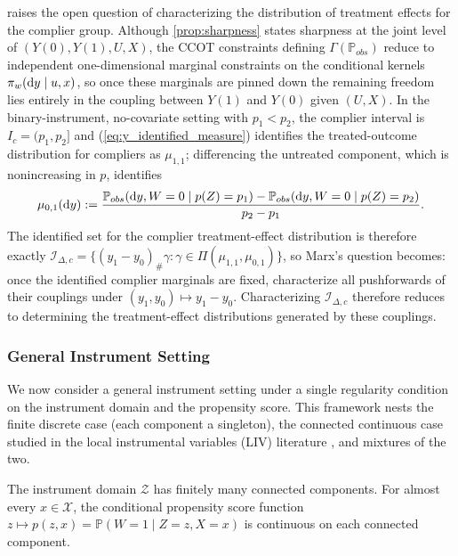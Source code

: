 \begin{remark} \label{rem:marx-open}
\citet{marx2024sharp} raises the open question of characterizing the distribution of treatment effects for the complier group. Although \cref{prop:sharpness} states sharpness at the joint level of $(Y(0), Y(1), U, X)$, the CCOT constraints defining $\Gamma(\mathbb{P}_{obs})$ reduce to independent one-dimensional marginal constraints on the conditional kernels $\pi_w({\rm d} y \mid u, x)$, so once these marginals are pinned down the remaining freedom lies entirely in the coupling between $Y(1)$ and $Y(0)$ given $(U, X)$. In the binary-instrument, no-covariate setting with $p_1 < p_2$, the complier interval is $I_c=(p_1,p_2]$ and (\ref{eq:y_identified_measure}) identifies the treated-outcome distribution for compliers as $\mu_{1,1}$; differencing the untreated component, which is nonincreasing in $p$, identifies
\[
\mu_{0,1}({\rm d} y)
:=
\frac{\mathbb{P}_{obs}({\rm d} y, W=0 \mid p(Z)=p_1)-\mathbb{P}_{obs}({\rm d} y, W=0 \mid p(Z)=p_2)}{p_2-p_1}.
\]
The identified set for the complier treatment-effect distribution is therefore exactly $\mathcal I_{\Delta,c} = \{(y_1-y_0)_{\#}\gamma : \gamma \in \Pi(\mu_{1,1},\mu_{0,1})\}$, so Marx's question becomes: once the identified complier marginals are fixed, characterize all pushforwards of their couplings under $(y_1,y_0)\mapsto y_1-y_0$. Characterizing $\mathcal I_{\Delta,c}$ therefore reduces to determining the treatment-effect distributions generated by these couplings.
\end{remark}

\subsubsection{General Instrument Setting}\label{subsubsec:continuous_iv}
We now consider a general instrument setting under a single regularity condition on the instrument domain and the propensity score. This framework nests the finite discrete case (each component a singleton), the connected continuous case studied in the local instrumental variables (LIV) literature \citep{heckman1999local}, and mixtures of the two.

\begin{assumption}\label{asp:continuity_p}
    The instrument domain $\mathcal{Z}$ has finitely many connected components. For almost every $x \in \mathcal{X}$, the conditional propensity score function $z \mapsto p(z,x) = \mathbb{P}(W=1 \mid Z=z, X=x)$ is continuous on each connected component.
\end{assumption}

